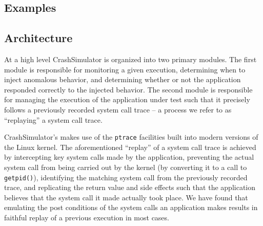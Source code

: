     \subsection{Examples}

    

    \subsection{Architecture}
        
    At a high level CrashSimulator is organized into two primary modules. The
    first module is responsible for monitoring a given execution, determining
    when to inject anomalous behavior, and determining whether or not the
    application responded correctly to the injected behavior. The second module
    is responsible for managing the execution of the application under test such
    that it precisely follows a previously recorded system call trace -- a
    process we refer to as ``replaying'' a system call trace.

        
    CrashSimulator's makes use of the {\tt ptrace} facilities built into modern
    versions of the Linux kernel. The aforementioned ``replay'' of a system call
    trace is achieved by intercepting key system calls made by the application,
    preventing the actual system call from being carried out by the kernel (by
    converting it to a call to {\tt getpid()}), identifying the matching system
    call from the previously recorded trace, and replicating the return value
    and side effects such that the application believes that the system call it
    made actually took place. We have found that emulating the post conditions
    of the system calls an application makes results in faithful replay of a
    previous execution in most cases.

